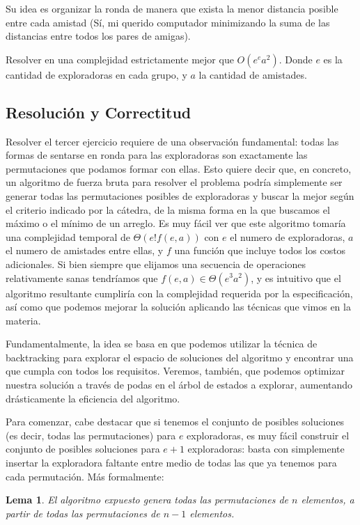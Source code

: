 \documentclass{article}
\newtheorem{lemma}{Lema}[theorem]
\theoremstyle{definition}
\theoremstyle{remark}
\begin{document}
Su idea es organizar la ronda de manera que exista la menor distancia posible entre cada amistad (Sí, mi querido computador minimizando la suma de las distancias entre todos los pares de amigas).

Resolver en una complejidad estrictamente mejor que $O(e^e a^2)$. Donde $e$ es la cantidad de exploradoras en cada grupo, y $a$ la cantidad de amistades.

\subsection{Resolución y Correctitud}

Resolver el tercer ejercicio requiere de una observación fundamental: todas las formas de sentarse en ronda para las exploradoras son exactamente las permutaciones que podamos formar con ellas. Esto quiere decir que, en concreto, un algoritmo de fuerza bruta para resolver el problema podría simplemente ser generar todas las permutaciones posibles de exploradoras y buscar la mejor según el criterio indicado por la cátedra, de la misma forma en la que buscamos el máximo o el mínimo de un arreglo. Es muy fácil ver que este algoritmo tomaría una complejidad temporal de $\Theta(e! f(e, a))$ con $e$ el numero de exploradoras, $a$ el numero de amistades entre ellas, y $f$ una función que incluye todos los costos adicionales. Si bien siempre que elijamos una secuencia de operaciones relativamente sanas tendríamos que $f(e, a) \in \Theta(e^3 a^2)$, y es intuitivo que el algoritmo resultante cumpliría con la complejidad requerida por la especificación, así como que podemos mejorar la solución aplicando las técnicas que vimos en la materia.

Fundamentalmente, la idea se basa en que podemos utilizar la técnica de backtracking para explorar el espacio de soluciones del algoritmo y encontrar una que cumpla con todos los requisitos. Veremos, también, que podemos optimizar nuestra solución a través de podas en el árbol de estados a explorar, aumentando drásticamente la eficiencia del algoritmo.

Para comenzar, cabe destacar que si tenemos el conjunto de posibles soluciones (es decir, todas las permutaciones) para $e$ exploradoras, es muy fácil construir el conjunto de posibles soluciones para $e+1$ exploradoras: basta con simplemente insertar la exploradora faltante entre medio de todas las que ya tenemos para cada permutación. Más formalmente:

\begin{lemma}
El algoritmo expuesto genera todas las permutaciones de $n$ elementos, a partir de todas las permutaciones de $n-1$ elementos.
\end{lemma}
\end{document}
